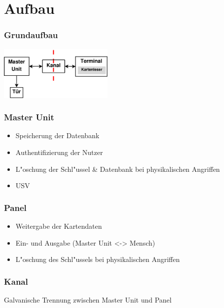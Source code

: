 \section{Aufbau}
\begin{frame}
\frametitle{Grundaufbau}
	\begin{center}
		\includegraphics[width=210px]{grundaufbau}
	\end{center}
\end{frame}

\begin{frame}
\frametitle{Master Unit}
	\begin{itemize}
		\item<2-> Speicherung der Datenbank
		\item<3-> Authentifizierung der Nutzer
		\item<4-> L"oschung der Schl"ussel \& Datenbank bei physikalischen Angriffen
		\item<5-> USV
	\end{itemize}
\end{frame}

\begin{frame}
\frametitle{Panel}
	\begin{itemize}
		\item<2-> Weitergabe der Kartendaten
		\item<3-> Ein- und Ausgabe \small{(Master Unit <-> Mensch)}
		\item<4-> L"oschung des Schl"ussels bei physikalischen Angriffen
	\end{itemize}
\end{frame}

\begin{frame}
\frametitle{Kanal}
	Galvanische Trennung zwischen Master Unit und Panel
\end{frame}

